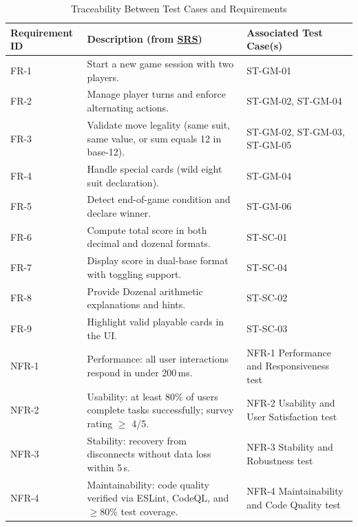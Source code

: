 \documentclass[12pt, titlepage]{article}
\begin{document}
\begin{table}[H]
    \centering
    \caption{Traceability Between Test Cases and Requirements}
    \label{TblTraceability}
    \begin{tabular}{|p{}|p{}|p{}|}
        \hline
        \textbf{Requirement ID} & \textbf{Description (from \href{../SRS/SRS.pdf}{SRS})} & \textbf{Associated Test Case(s)} \\ \hline

        FR-1 & Start a new game session with two players. & ST-GM-01 \\ \hline
        FR-2 & Manage player turns and enforce alternating actions. & ST-GM-02, ST-GM-04 \\ \hline
        FR-3 & Validate move legality (same suit, same value, or sum equals 12 in base-12). & ST-GM-02, ST-GM-03, ST-GM-05 \\ \hline
        FR-4 & Handle special cards (wild eight suit declaration). & ST-GM-04 \\ \hline
        FR-5 & Detect end-of-game condition and declare winner. & ST-GM-06 \\ \hline
        FR-6 & Compute total score in both decimal and dozenal formats. & ST-SC-01 \\ \hline
        FR-7 & Display score in dual-base format with toggling support. & ST-SC-04 \\ \hline
        FR-8 & Provide Dozenal arithmetic explanations and hints. & ST-SC-02 \\ \hline
        FR-9 & Highlight valid playable cards in the UI. & ST-SC-03 \\ \hline

        NFR-1 & Performance: all user interactions respond in under 200\,ms. & NFR-1 Performance and Responsiveness test \\ \hline
        NFR-2 & Usability: at least 80\% of users complete tasks successfully; survey rating $\geq$ 4/5. & NFR-2 Usability and User Satisfaction test \\ \hline
        NFR-3 & Stability: recovery from disconnects without data loss within 5\,s. & NFR-3 Stability and Robustness test \\ \hline
        NFR-4 & Maintainability: code quality verified via ESLint, CodeQL, and $\geq$80\% test coverage. & NFR-4 Maintainability and Code Quality test \\ \hline

    \end{tabular}
\end{table}
\end{document}
